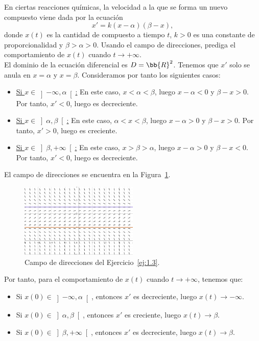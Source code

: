 \begin{ejercicio} \label{ej:1.3}
    En ciertas reacciones químicas, la velocidad a la que se forma un nuevo compuesto viene dada por la ecuación
    \begin{equation*}
        x' = k(x - \alpha)(\beta - x),
    \end{equation*}
    donde \(x(t)\) es la cantidad de compuesto a tiempo \(t\), \(k > 0\) es una constante de proporcionalidad y \(\beta > \alpha > 0\). Usando el campo de direcciones, prediga el comportamiento de \(x(t)\) cuando \(t \to +\infty\).\\

    El dominio de la ecuación diferencial es $D=\bb{R}^2$.
    Tenemos que $x'$ solo se anula en $x=\alpha$ y $x=\beta$.
    Consideramos por tanto los siguientes casos:
    \begin{itemize}
        \item \ul{Si $x\in \left]-\infty, \alpha\right[$:} En este caso, $x<\alpha<\beta$, luego $x-\alpha<0$ y $\beta-x>0$. Por tanto, $x'<0$, luego es decreciente.
        \item \ul{Si $x\in \left]\alpha, \beta\right[$:} En este caso, $\alpha<x<\beta$, luego $x-\alpha>0$ y $\beta-x>0$. Por tanto, $x'>0$,
        luego es creciente.
        \item \ul{Si $x\in \left]\beta, +\infty\right[$:} En este caso, $x>\beta>\alpha$, luego $x-\alpha>0$ y $\beta-x<0$. Por tanto, $x'<0$,
        luego es decreciente.
    \end{itemize}

    El campo de direcciones se encuentra en la Figura~\ref{fig:ej1.3}.
    \begin{figure}[H]
        \centering
        \includegraphics[width=0.5\textwidth]{Imagenes/Rel1_Ej3.png}
        \caption{Campo de direcciones del Ejercicio~\ref{ej:1.3}.}
        \label{fig:ej1.3}
    \end{figure}

    Por tanto, para el comportamiento de $x(t)$ cuando $t\to +\infty$, tenemos que:
    \begin{itemize}
        \item Si $x(0)\in \left]-\infty, \alpha\right[$, entonces $x'$ es decreciente, luego $x(t)\to -\infty$.
        \item Si $x(0)\in \left]\alpha, \beta\right[$, entonces $x'$ es creciente, luego $x(t)\to \beta$.
        \item Si $x(0)\in \left]\beta, +\infty\right[$, entonces $x'$ es decreciente, luego $x(t)\to \beta$.
    \end{itemize}

\end{ejercicio}


